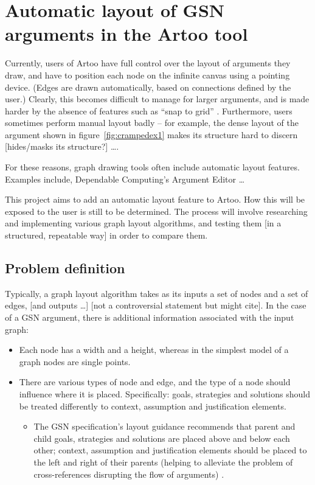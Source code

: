 \section{Automatic layout of GSN arguments in the Artoo tool}

Currently, users of Artoo have full control over the layout of arguments they draw, and have to position each node on the infinite canvas using a pointing device.
(Edges are drawn automatically, based on connections defined  by the user.)
Clearly, this becomes difficult to manage for larger arguments, and is made harder by the absence of features such as ``snap to grid'' .
Furthermore, users sometimes perform manual layout badly -- for example, the dense layout of the argument shown in figure~\ref{fig:crampedex1} makes its structure hard to discern [hides/masks its structure?] \ldots {}.

For these reasons, graph drawing tools often include automatic layout features. Examples include, Dependable Computing's Argument Editor  \ldots

This project aims to add an automatic layout feature to Artoo.
How this will be exposed to the user is still to be determined. 
The process will involve researching and implementing various graph layout algorithms,
and testing them [in a structured, repeatable way] in order to compare them. 

\subsection{Problem definition}

Typically, a graph layout algorithm takes as its inputs a set of nodes and a set of edges, [and outputs \ldots] [not a controversial statement but might cite].
In the case of a GSN argument, there is additional information associated with the input graph:

\begin{itemize}
  \item
    Each node has a width and a height, whereas in the simplest model of a graph nodes are single points. 
  \item
    There are various types of node and edge, and the type of a node should influence where it is placed. Specifically: goals, strategies and solutions should be treated differently to context, assumption and justification elements.
    \begin{itemize}
    \item The GSN specification's layout guidance \citep[section~2.2, pp.~26--27]{gsnstandard} recommends that parent and child goals, strategies and solutions are placed above and below each other; context, assumption and justification elements should be placed to the left and right of their parents (helping to alleviate the problem of cross-references disrupting the flow of arguments) .
    \end{itemize}
\end{itemize}

